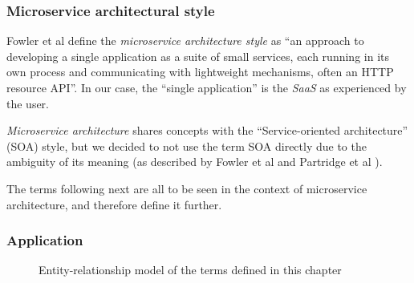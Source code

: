 \subsubsection{Microservice architectural style}
\label{subsec:microservice_architecture}


Fowler et al \cite{fowler-microservices} define the \emph{microservice architecture style} as ``an approach to developing a single application as a suite of small services, each running in its own process and communicating with lightweight mechanisms, often an HTTP resource API''. In our case, the ``single application'' is the \emph{SaaS} as experienced by the user.

\emph{Microservice architecture} shares concepts with the ``Service-oriented architecture'' (SOA) style, but we decided to not use the term SOA directly due to the ambiguity of its meaning (as described by Fowler et al \cite{FowlerSOAAmbiguity} and Partridge et al \cite{modServicesAnalysis}).

The terms following next are all to be seen in the context of microservice architecture, and therefore define it further.

\subsubsection{Application}
\label{ss:application}

\begin{figure}[h!]
  \caption{Entity-relationship model of the terms defined in this chapter}
  \label{fig:software-env-erm}
\end{figure}

